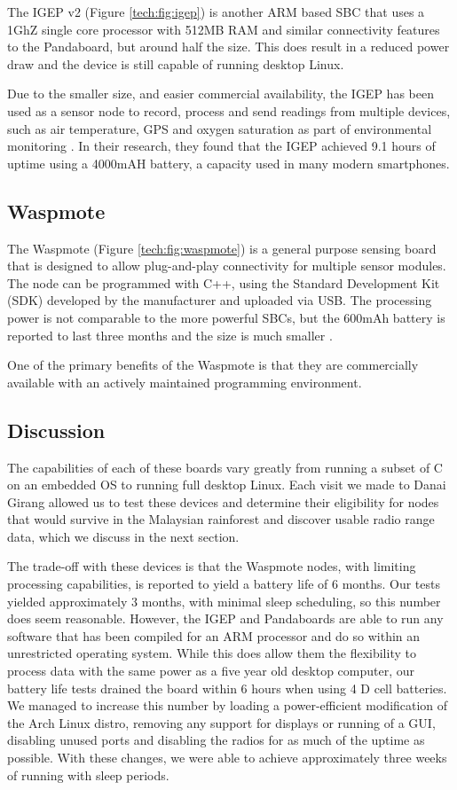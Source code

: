 The IGEP v2 (Figure \ref{tech:fig:igep}) is another ARM based SBC that uses a 1GhZ single core processor with 512MB RAM and similar connectivity features to the Pandaboard, but around half the size. This does result in a reduced power draw and the device is still capable of running desktop Linux.

Due to the smaller size, and easier commercial availability, the IGEP has been used as a sensor node to record, process and send readings from multiple devices, such as air temperature, GPS and oxygen saturation as part of environmental monitoring \cite{Resch}. In their research, they found that the IGEP achieved 9.1 hours of uptime using a 4000mAH battery, a capacity used in many modern smartphones.

\subsection{Waspmote}\label{tech:waspmote}
The Waspmote (Figure \ref{tech:fig:waspmote}) is a general purpose sensing board that is designed to allow plug-and-play connectivity for multiple sensor modules. The node can be programmed with C++, using the Standard Development Kit (SDK) developed by the manufacturer and uploaded via USB. The processing power is not comparable to the more powerful SBCs, but the 600mAh battery is reported to last three months and the size is much smaller \cite{waspmote}.

One of the primary benefits of the Waspmote is that they are commercially available with an actively maintained programming environment.

\subsection{Discussion} \label{tech:hw:conc}
The capabilities of each of these boards vary greatly from running a subset of C on an embedded OS to running full desktop Linux. Each visit we made to Danai Girang allowed us to test these devices and determine their eligibility for nodes that would survive in the Malaysian rainforest and discover usable radio range data, which we discuss in the next section.

The trade-off with these devices is that the Waspmote nodes, with limiting processing capabilities, is reported to yield a battery life of 6 months. Our tests yielded approximately 3 months, with minimal sleep scheduling, so this number does seem reasonable. However, the IGEP and Pandaboards are able to run any software that has been compiled for an ARM processor and do so within an unrestricted operating system. While this does allow them the flexibility to process data with the same power as a five year old desktop computer, our battery life tests drained the board within 6 hours when using 4 D cell batteries. We managed to increase this number by loading a power-efficient modification of the Arch Linux distro, removing any support for displays or running of a GUI, disabling unused ports and disabling the radios for as much of the uptime as possible. With these changes, we were able to achieve approximately three weeks of running with sleep periods.

